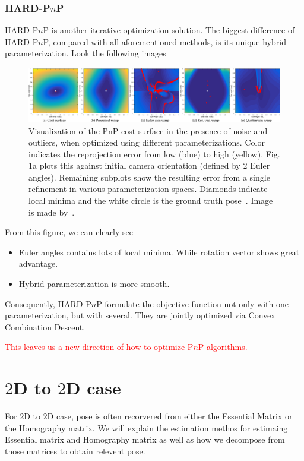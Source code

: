 \documentclass[a4paper]{report}
\begin{document}
\subsection{HARD-P$n$P}
HARD-P$n$P is another iterative optimization solution. The biggest difference of HARD-P$n$P, compared with all aforementioned methods, is its unique hybrid parameterization. Look the following images

\begin{figure}
\centering
\includegraphics[scale=0.14]{hand_eye_files/vision/figures/hadfi1-2806446-hires.png}
\caption{Visualization of the PnP cost surface in the presence of noise and outliers, when optimized using different parameterizations. Color indicates the reprojection error from low (blue) to high (yellow). Fig. 1a plots this against initial camera orientation (defined by 2 Euler angles). Remaining subplots show the resulting error from a single refinement in various parameterization spaces. Diamonds indicate local minima and the white circle is the ground truth pose~\cite{8292943}. Image is made by~\cite{8292943}.}
\end{figure}
From this figure, we can clearly see
\begin{itemize}
\item Euler angles contains lots of local minima. While rotation vector shows great advantage.
\item Hybrid parameterization is more smooth.
\end{itemize}
Consequently, HARD-P$n$P formulate the objective function not only with one parameterization, but with several. They are jointly optimized via Convex Combination Descent. 

\textcolor{red}{This leaves us a new direction of how to optimize P$n$P algorithms.}

\chapter{$2$D to $2$D case}
For $2$D to $2$D case, pose is often recorvered from either the Essential Matrix or the Homography matrix. We will explain the estimation methos for estimaing Essential matrix and Homography matrix as well as how we decompose from those matrices to obtain relevent pose.
\end{document}
